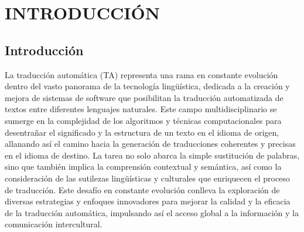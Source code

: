 \documentclass[11pt]{book}
\begin{document}
\chapter{INTRODUCCIÓN}
\section{Introducción} \label{sec:S1}
La traducción automática (TA) representa una rama en constante evolución dentro del vasto panorama de la tecnología lingüística, dedicada a la creación y mejora de sistemas de software que posibilitan la traducción automatizada de textos entre diferentes lenguajes naturales. Este campo multidisciplinario se sumerge en la complejidad de los algoritmos y técnicas computacionales para desentrañar el significado y la estructura de un texto en el idioma de origen, allanando así el camino hacia la generación de traducciones coherentes y precisas en el idioma de destino. La tarea no solo abarca la simple sustitución de palabras, sino que también implica la comprensión contextual y semántica, así como la consideración de las sutilezas lingüísticas y culturales que enriquecen el proceso de traducción. Este desafío en constante evolución conlleva la exploración de diversas estrategias y enfoques innovadores para mejorar la calidad y la eficacia de la traducción automática, impulsando así el acceso global a la información y la comunicación intercultural.
\end{document}
